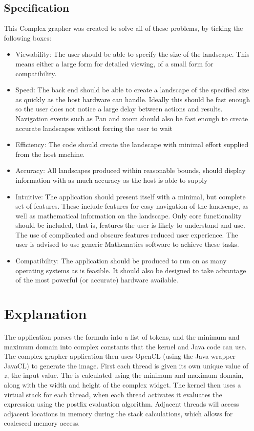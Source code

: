 \documentclass{article}
\begin{document}
	\subsection{Specification}
		This Complex grapher was created to solve all of these problems, by ticking the following boxes:
		
		\begin{itemize}
			\item Viewability: The user should be able to specify the size of the landscape. This means either a large form for detailed viewing, of a small form for compatibility.
			
			\item Speed: The back end should be able to create a landscape of the specified size as quickly as the host hardware can handle. Ideally this should be fast enough so the user does not notice a large delay between actions and results. Navigation events such as Pan and zoom should also be fast enough to create accurate landscapes without forcing the user to wait
			
			\item Efficiency: The code should create the landscape with minimal effort supplied from the host machine.
			
			\item Accuracy: All landscapes produced within reasonable bounds, should display information with as much accuracy as the host
			is able to supply
			
			\item Intuitive: The application should present itself with a minimal, but complete set of features. These include features for easy navigation of the landscape, as well as mathematical information on the landscape. Only core functionality should be included, that is, features the user is likely to understand and use. The use of complicated and obscure features reduced user experience. The user is advised to use generic Mathematics software to achieve these tasks.
			
			\item Compatibility: The application should be produced to run on as many operating systems as is feasible. It should also be designed to take advantage of the most powerful (or accurate) hardware available.
		\end{itemize}
	
	\section{Explanation}
	The application parses the formula into a list of tokens, and the minimum and maximum domain into complex constants that the kernel and Java code can use. The complex grapher application then uses OpenCL (using the Java wrapper JavaCL) to generate the image. First each thread is given its own unique value of $z$, the input value. The is calculated using the minimum and maximum domain, along with the width and height of the complex widget. The kernel then uses a virtual stack for each thread, when each thread activates it evaluates the expression using the postfix evaluation algorithm. Adjacent threads will access adjacent locations in memory during the stack calculations, which allows for coalesced memory access. 
	
\end{document}
